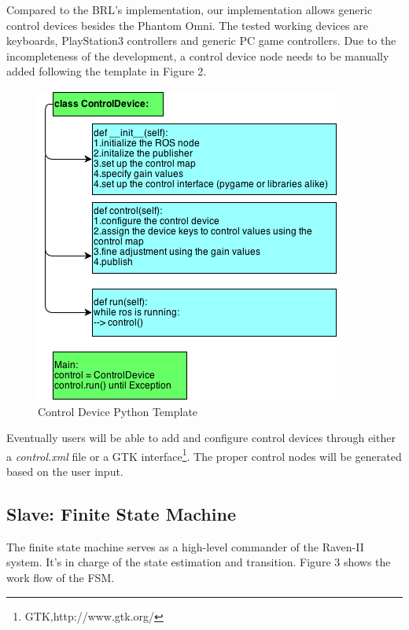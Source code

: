 \documentclass[letterpaper,twocolumn,10pt]{article}
\begin{document}
Compared to the BRL's implementation, our implementation allows
generic control devices besides the Phantom Omni. The tested working
devices are keyboards, PlayStation3 controllers and generic PC game
controllers. Due to the incompleteness of the development, a control
device node needs to be manually added following the template in
Figure 2.

\begin{figure}[h]
\includegraphics[scale=0.6]{ControlDeviceTemplate.png}
\caption{Control Device Python Template}
\end{figure}

Eventually users will be able to add and configure control devices
through either a {\it control.xml} file or a GTK
interface\footnote{GTK,http://www.gtk.org/}. The proper control nodes
will be generated based on the user input.

\subsection{Slave: Finite State Machine}

The finite state machine serves as a high-level commander of the
Raven-II system. It's in charge of the state estimation and
transition. Figure 3 shows the work flow of the FSM.
\end{document}
